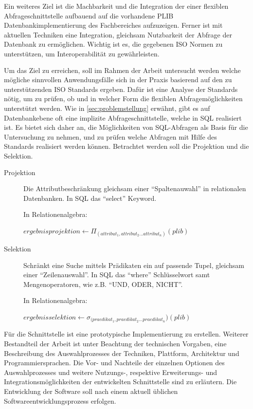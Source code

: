 Ein weiteres Ziel ist die Machbarkeit und die Integration der einer flexiblen \gls{Abfrageschnittstelle} aufbauend auf die vorhandene PLIB Datenbankimplementierung des Fachbereiches aufzuzeigen. 
Ferner ist mit aktuellen Techniken eine Integration, gleichsam Nutzbarkeit der Abfrage der Datenbank zu ermöglichen. Wichtig ist es, die gegebenen ISO Normen zu unterstützen, um Interoperabilität zu gewährleisten. 

Um das Ziel zu erreichen, soll im Rahmen der Arbeit untersucht werden welche mögliche sinnvollen Anwendungsfälle sich in der Praxis basierend auf den zu unterstützenden ISO Standards ergeben. Dafür ist eine Analyse der Standards nötig, um zu prüfen, ob und in welcher Form die flexiblen Abfragemöglichkeiten unterstützt werden. Wie in \autoref{sec:problemstellung} erwähnt, gibt es auf Datenbankebene oft eine implizite Abfrageschnittstelle, welche in SQL realisiert ist. Es bietet sich daher an, die Möglichkeiten von SQL-Abfragen als Basis für die Untersuchung zu nehmen, und zu prüfen welche Abfragen mit Hilfe des Standards realisiert werden können. 
Betrachtet werden soll die Projektion und die Selektion.

\begin{description}
\item[Projektion] Die Attributbeschränkung gleichsam einer \enquote{Spaltenauwahl} in relationalen Datenbanken. In SQL das \enquote{select} Keyword.   

In Relationenalgebra:

$ergebnisprojektion \leftarrow  \Pi_{(attribut_1, attribut_2... attribut_n)}(plib)$ \\

\item[Selektion] Schränkt eine Suche mittels Prädikaten ein auf passende Tupel, gleichsam einer \enquote{Zeilenauswahl}. In SQL das \enquote{where} Schlüsselwort samt Mengenoperatoren, wie z.B. \enquote{UND, ODER, NICHT}.

In Relationenalgebra:

$ergebnisselektion \leftarrow  \sigma_{(praedikat_1, praedikat_2... praedikat_n})(plib)$ \\

\end{description}

Für die Schnittstelle ist eine prototypische Implementierung zu erstellen. Weiterer Bestandteil der Arbeit ist unter Beachtung der technischen Vorgaben, eine Beschreibung des Auswahlprozesses der Techniken, Plattform, Architektur und Programmiersprachen. Die Vor- und Nachteile der einzelnen Optionen des Auswahlprozesses und weitere Nutzungs-, respektive Erweiterungs- und Integrationsmöglichkeiten der entwickelten Schnittstelle sind zu erläutern. 
Die Entwicklung der Software soll nach einem aktuell üblichen Softwareentwicklungsprozess erfolgen. 

